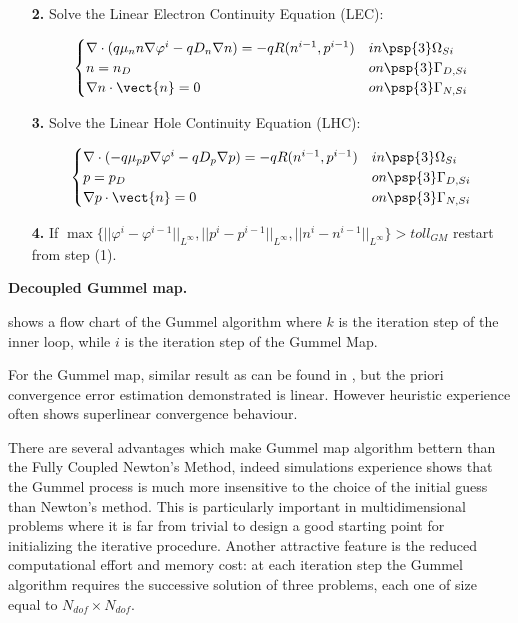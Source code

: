 {\begin{itemize}
\item[\bf 2.] Solve the Linear Electron Continuity Equation (LEC):

\vspace{-0.5cm}

\begin{equation}
\label{eq: LEC system}
\begin{cases}
 \nabla \cdot ( q\mu_n n \nabla \varphi^i - qD_n \nabla n ) = -qR(n^{i-1},p^{i-1}) & in \psp{3} \Omega_{Si}
 \\
 n = n_D & on \psp{3} \Gamma_{D,Si}
 \\
 \nabla n \cdot \vect{n} = 0 & on \psp{3} \Gamma_{N,Si}
\end{cases}
\end{equation}

\item[\bf 3.] Solve the Linear Hole Continuity Equation (LHC):

\vspace{-0.5cm}

\begin{equation}
\label{eq: LHC system}
\begin{cases}
\nabla \cdot (- q\mu_p p \nabla \varphi^i - qD_p \nabla p ) =  -qR(n^{i-1},p^{i-1}) & in \psp{3} \Omega_{Si}
\\
 p = p_D & on \psp{3} \Gamma_{D,Si}
 \\
 \nabla p \cdot \vect{n} = 0 & on \psp{3} \Gamma_{N,Si}
\end{cases}
\end{equation}

\item[\bf 4.] If $\max\{||\varphi^i-\varphi^{i-1}||_{L^{\infty}},||p^i-p^{i-1}||_{L^{\infty}},||n^i-n^{i-1}||_{L^{\infty}}\}>toll_{GM}$ restart from step (1).


\end{itemize}

}{\textbf{Decoupled Gummel map.}}

  shows a flow chart of the Gummel algorithm where $k$ is the iteration step of the inner loop, while $i$ is the iteration step of the Gummel Map.
 
For the Gummel map, similar result as   can be found in \cite{Jerome:AnalyCharTran}, but the  priori convergence error estimation demonstrated is linear. However heuristic experience often shows superlinear convergence behaviour.

There are several advantages which make Gummel map algorithm bettern than the Fully Coupled Newton's Method, indeed simulations experience shows that the Gummel process is much more insensitive to the choice of the initial guess than Newton's method. This is particularly important in multidimensional problems where it is far from trivial to design a good starting point for initializing the iterative procedure. Another attractive feature is the reduced computational effort and memory cost: at each iteration step the Gummel algorithm requires the successive solution of three problems, each one of size equal to $N_{dof}\times N_{dof}$.





